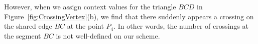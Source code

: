 However, when we assign context values for the triangle $BCD$ in Figure~\ref{fig:CrossingVertex}(b), we find that there suddenly appears a crossing on the shared edge $BC$ at the point $P_4$. In other words, the number of crossings at the segment $BC$ is not well-defined on our scheme.









